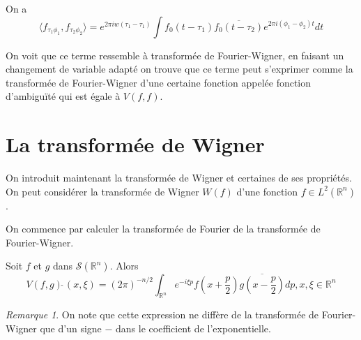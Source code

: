 \documentclass[a4paper, 12pt]{report}
\newcommand{\R}{\mathbb{R}} %
\renewcommand{\.}{\cdot} %
\theoremstyle{break}
\theoremstyle{remark}
\newtheorem{remark}{Remarque}
\theoremstyle{proofstyle}
\begin{document}
On a $$\langle f_{\tau_1 \phi_1} , f_{\tau _2 \phi_2} \rangle = e^{2 \pi i w (\tau _1 - \tau _1)} \int f_0(t- \tau_1) \overline{f_0(t-\tau_2)}e^{2 \pi i(\phi_1 - \phi_2)t}dt$$

On voit que ce terme ressemble à transformée de Fourier-Wigner, en faisant un changement de variable adapté on trouve que ce terme peut s'exprimer comme la transformée de Fourier-Wigner d'une certaine fonction appelée fonction d'ambiguïté qui est égale à $V(f,f)$.


\section{La transformée de Wigner} %

On introduit maintenant la transformée de Wigner et certaines de ses propriétés. On peut considérer la transformée de Wigner $W(f)$ d'une fonction $f \in L^2(\R^n)$.%

On commence par calculer la transformée de Fourier de la transformée de Fourier-Wigner.

\begin{theorem}
    Soit $f$ et $g$ dans $\mathcal{S}(\R^n)$. Alors
    $$V(f,g)\hat{~}(x, \xi) = (2 \pi) ^{-n/2} \int_{\R^n} e^{-i \xi p} f\left(x+ \frac{p}{2}\right) \overline{g\left(x-\frac{p}{2}\right)} dp, x, \xi \in \R^n$$
\end{theorem}

\begin{remark}
    On note que cette expression ne diffère de la transformée de Fourier-Wigner que d'un signe $-$ dans le coefficient de l'exponentielle.
\end{remark}
\end{document}
